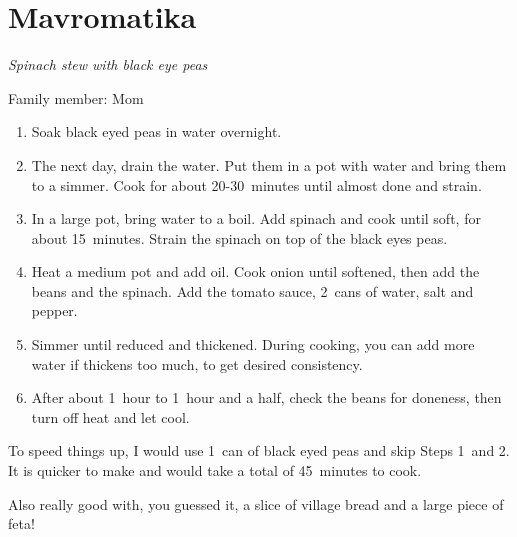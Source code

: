 \chapter{Mavromatika}
\label{ch:mavromatika}


\textit{Spinach stew with black eye peas}

Family member: Mom

\begin{enumerate}
    \item Soak black eyed peas in water overnight.
    \item The next day, drain the water. Put them in a pot with water and bring them to a simmer. Cook for about 20-30~minutes until almost done and strain.
    \item In a large pot, bring water to a boil. Add spinach and cook until soft, for about 15~minutes. Strain the spinach on top of the black eyes peas.
    \item Heat a medium pot and add oil. Cook onion until softened, then add the beans and the spinach. Add the tomato sauce, 2~cans of water, salt and pepper.
    \item Simmer until reduced and thickened. During cooking, you can add more water if thickens too much, to get desired consistency.
    \item After about 1~hour to 1~hour and a half, check the beans for doneness, then turn off heat and let cool.
\end{enumerate}

To speed things up, I would use 1~can of black eyed peas and skip Steps 1~and 2. It is quicker to make and would take a total of 45~minutes to cook.

Also really good with, you guessed it, a slice of village bread and a large piece of feta!
